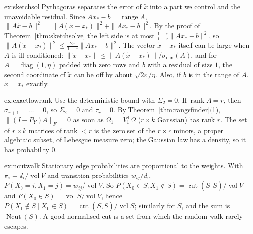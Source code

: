 \begin{solution}{ex:sketchsol}
\idea Pythagoras separates the error of $\tilde x$ into a part we control and the unavoidable residual.
\writeup Since $Ax_*-b\perp\operatorname{range}A$, $\|A\tilde x-b\|^2=\|A(\tilde x-x_*)\|^2+\|Ax_*-b\|^2$. By the proof of Theorem~\ref{thm:sketchsolve} the left side is at most $\frac{1+\varepsilon}{1-\varepsilon}\|Ax_*-b\|^2$, so
$\|A(\tilde x-x_*)\|^2\le\frac{2\varepsilon}{1-\varepsilon}\|Ax_*-b\|^2$. The vector $\tilde x-x_*$ itself can be large when $A$ is ill-conditioned: $\|\tilde x-x_*\|\le\|A(\tilde x-x_*)\|/\sigma_{\min}(A)$, and for
$A=\operatorname{diag}(1,\eta)$ padded with zero rows and $b$ with a residual of size $1$, the second coordinate of $\tilde x$ can be off by about $\sqrt{2\varepsilon}/\eta$. Also, if $b$ is in the range of $A$,
$\tilde x=x_*$ exactly.
\end{solution}

\begin{solution}{ex:exactlowrank}
\idea Use the deterministic bound with $\Sigma_2=0$.
\writeup If $\operatorname{rank}A=r$, then $\sigma_{r+1}=\dots=0$, so $\Sigma_2=0$ and $\tau_r=0$. By Theorem~\ref{thm:rangefinder}(1), $\|(I-P_Y)A\|_F=0$ as soon as $\Omega_1=V_1^{\mathsf T}\Omega$ ($r\times k$ Gaussian)
has rank $r$. The set of $r\times k$ matrices of rank $<r$ is the zero set of the $r\times r$ minors, a proper algebraic subset, of Lebesgue measure zero; the Gaussian law has a density, so it
has probability $0$.
\end{solution}

\begin{solution}{ex:ncutwalk}
\idea Stationary edge probabilities are proportional to the weights.
\writeup With $\pi_i=d_i/\operatorname{vol}V$ and transition probabilities $w_{ij}/d_i$, $P(X_0=i,X_1=j)=w_{ij}/\operatorname{vol}V$. So $P(X_0\in S,X_1\notin S)=\operatorname{cut}(S,\bar S)/\operatorname{vol}V$
and $P(X_0\in S)=\operatorname{vol}S/\operatorname{vol}V$, hence $P(X_1\notin S\mid X_0\in S)=\operatorname{cut}(S,\bar S)/\operatorname{vol}S$; similarly for $\bar S$, and the sum is $\operatorname{Ncut}(S)$. A good
normalised cut is a set from which the random walk rarely escapes.
\end{solution}

